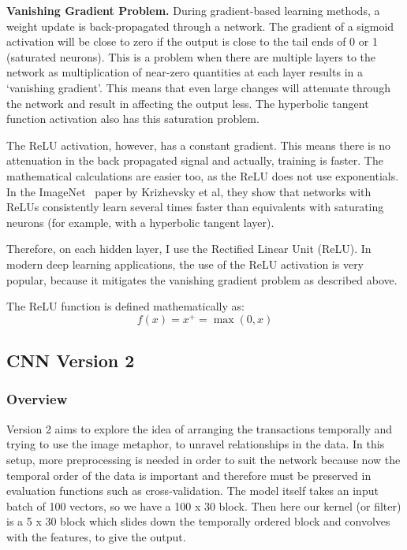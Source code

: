\documentclass[12pt,a4paper,twoside]{report}
\begin{document}
\textbf{Vanishing Gradient Problem.}
During gradient-based learning methods, a weight update is back-propagated through a network. The gradient of a sigmoid activation will be close to zero if the output is close to the tail ends of 0 or 1 (saturated neurons). This is a problem when there are multiple layers to the network as multiplication of near-zero quantities at each layer results in a `vanishing gradient'. This means that even large changes will attenuate through the network and result in affecting the output less. The hyperbolic tangent function activation also has this saturation problem. 

The ReLU activation, however, has a constant gradient. This means there is no attenuation in the back propagated signal and actually, training is faster. The mathematical calculations are easier too, as the ReLU does not use exponentials. In the ImageNet~\cite{krizhevsky2012imagenet} paper by Krizhevsky et al, they show that networks with ReLUs consistently learn several times faster than equivalents with saturating neurons (for example, with a hyperbolic tangent layer).

Therefore, on each hidden layer, I use the Rectified Linear Unit (ReLU). In modern deep learning applications, the use of the ReLU activation is very popular, because it mitigates the vanishing gradient problem as described above. 

The ReLU function is defined mathematically as:
$$f ( x ) = x ^ { + } = \max ( 0,x )$$

\subsection{CNN Version 2}

\subsubsection{Overview}

Version 2 aims to explore the idea of arranging the transactions temporally and trying to use the image metaphor, to unravel relationships in the data. In this setup, more preprocessing is needed in order to suit the network because now the temporal order of the data is important and therefore must be preserved in evaluation functions such as cross-validation. The model itself takes an input batch of 100 vectors, so we have a 100 x 30 block. Then here our kernel (or filter) is a 5 x 30 block which slides down the temporally ordered block and convolves with the features, to give the output. 
\end{document}
